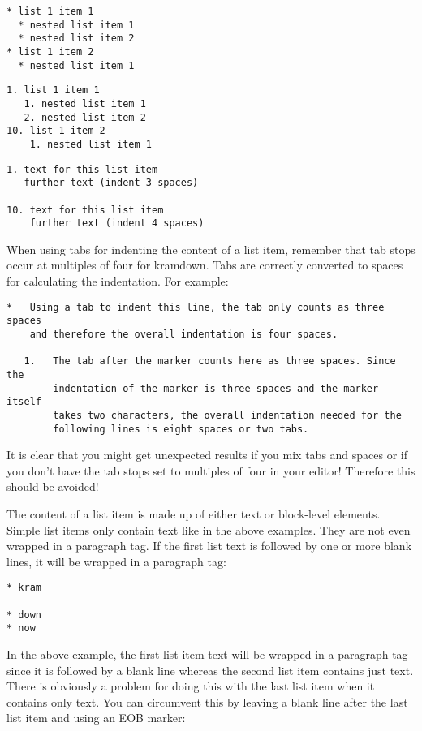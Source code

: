 \documentclass[a4paper]{article}
\begin{document}
\begin{verbatim}
* list 1 item 1
  * nested list item 1
  * nested list item 2
* list 1 item 2
  * nested list item 1
\end{verbatim}

\begin{verbatim}
1. list 1 item 1
   1. nested list item 1
   2. nested list item 2
10. list 1 item 2
    1. nested list item 1
\end{verbatim}

\begin{verbatim}
1. text for this list item
   further text (indent 3 spaces)

10. text for this list item
    further text (indent 4 spaces)
\end{verbatim}

When using tabs for indenting the content of a list item, remember that
tab stops occur at multiples of four for kramdown. Tabs are correctly
converted to spaces for calculating the indentation. For example:

\begin{verbatim}
*   Using a tab to indent this line, the tab only counts as three spaces
    and therefore the overall indentation is four spaces.

   1.   The tab after the marker counts here as three spaces. Since the
        indentation of the marker is three spaces and the marker itself
        takes two characters, the overall indentation needed for the
        following lines is eight spaces or two tabs.
\end{verbatim}

It is clear that you might get unexpected results if you mix tabs and
spaces or if you don't have the tab stops set to multiples of four in
your editor! Therefore this should be avoided!

The content of a list item is made up of either text or block-level
elements. Simple list items only contain text like in the above
examples. They are not even wrapped in a paragraph tag. If the first
list text is followed by one or more blank lines, it will be wrapped in
a paragraph tag:

\begin{verbatim}
* kram

* down
* now
\end{verbatim}

In the above example, the first list item text will be wrapped in a
paragraph tag since it is followed by a blank line whereas the second
list item contains just text. There is obviously a problem for doing
this with the last list item when it contains only text. You can
circumvent this by leaving a blank line after the last list item and
using an EOB marker:
\end{document}
